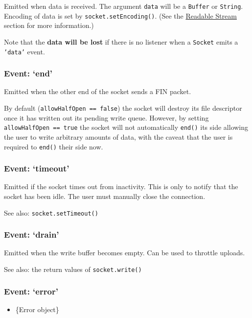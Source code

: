 Emitted when data is received. The argument \texttt{data} will be a
\texttt{Buffer} or \texttt{String}. Encoding of data is set by
\texttt{socket.setEncoding()}. (See the
\href{stream.html\#stream\_readable\_stream}{Readable Stream} section
for more information.)

Note that the \textbf{data will be lost} if there is no listener when a
\texttt{Socket} emits a \texttt{'data'} event.

\subsubsection{Event: `end'}

Emitted when the other end of the socket sends a FIN packet.

By default (\texttt{allowHalfOpen == false}) the socket will destroy its
file descriptor once it has written out its pending write queue.
However, by setting \texttt{allowHalfOpen == true} the socket will not
automatically \texttt{end()} its side allowing the user to write
arbitrary amounts of data, with the caveat that the user is required to
\texttt{end()} their side now.

\subsubsection{Event: `timeout'}

Emitted if the socket times out from inactivity. This is only to notify
that the socket has been idle. The user must manually close the
connection.

See also: \texttt{socket.setTimeout()}

\subsubsection{Event: `drain'}

Emitted when the write buffer becomes empty. Can be used to throttle
uploads.

See also: the return values of \texttt{socket.write()}

\subsubsection{Event: `error'}

\begin{itemize}
\item
  \{Error object\}
\end{itemize}

